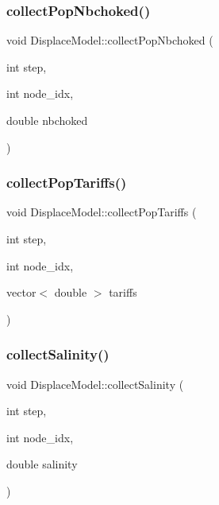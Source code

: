\mbox{\label{class_displace_model_a89a48eda7c02b492f4ea6abca370a050}} 
\subsubsection{\texorpdfstring{collectPopNbchoked()}{collectPopNbchoked()}}
{\footnotesize\ttfamily void Displace\+Model\+::collect\+Pop\+Nbchoked (\begin{DoxyParamCaption}\item[{int}]{step,  }\item[{int}]{node\+\_\+idx,  }\item[{double}]{nbchoked }\end{DoxyParamCaption})}

\mbox{\label{class_displace_model_afb45bf9e8f5f3cc2f8f25c91d9a0366e}} 
\subsubsection{\texorpdfstring{collectPopTariffs()}{collectPopTariffs()}}
{\footnotesize\ttfamily void Displace\+Model\+::collect\+Pop\+Tariffs (\begin{DoxyParamCaption}\item[{int}]{step,  }\item[{int}]{node\+\_\+idx,  }\item[{vector$<$ double $>$}]{tariffs }\end{DoxyParamCaption})}

\mbox{\label{class_displace_model_a5a19cbd32d24f58f62f99b862decb818}} 
\subsubsection{\texorpdfstring{collectSalinity()}{collectSalinity()}}
{\footnotesize\ttfamily void Displace\+Model\+::collect\+Salinity (\begin{DoxyParamCaption}\item[{int}]{step,  }\item[{int}]{node\+\_\+idx,  }\item[{double}]{salinity }\end{DoxyParamCaption})}

